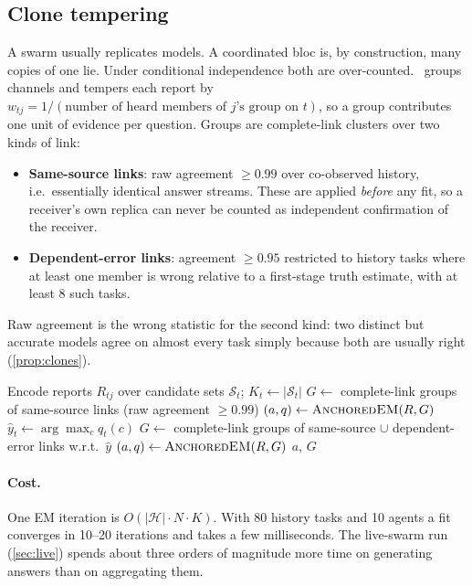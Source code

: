 \subsection{Clone tempering}
A swarm usually replicates models. A coordinated bloc is, by construction, many copies of one lie. Under conditional independence both are over-counted. \race\ groups channels and tempers each report by $w_{tj}=1/(\text{number of heard members of $j$'s group on $t$})$, so a group contributes one unit of evidence per question. Groups are complete-link clusters over two kinds of link:
\begin{itemize}
\item \textbf{Same-source links}: raw agreement $\ge 0.99$ over co-observed history, i.e.\ essentially identical answer streams. These are applied \emph{before} any fit, so a receiver's own replica can never be counted as independent confirmation of the receiver.
\item \textbf{Dependent-error links}: agreement $\ge 0.95$ restricted to history tasks where at least one member is wrong relative to a first-stage truth estimate, with at least 8 such tasks.
\end{itemize}
Raw agreement is the wrong statistic for the second kind: two distinct but accurate models agree on almost every task simply because both are usually right (\cref{prop:clones}).

\begin{algorithm}[t]
\caption{\race\ fit for one receiver $i$ (history $\mathcal H$, no labels)}\label{alg:race}
\begin{algorithmic}[1]
\State Encode reports $R_{tj}$ over candidate sets $\mathcal S_t$; $K_t\gets|\mathcal S_t|$
\State $G\gets$ complete-link groups of same-source links (raw agreement $\ge 0.99$)
\State $(a,q)\gets\textsc{AnchoredEM}(R, G)$ 
\State $\hat y_t\gets\arg\max_c q_t(c)$
\State $G\gets$ complete-link groups of same-source $\cup$ dependent-error links w.r.t.\ $\hat y$
\State $(a,q)\gets\textsc{AnchoredEM}(R, G)$
\State \Return $a$, $G$ 
\end{algorithmic}
\end{algorithm}

\paragraph{Cost.} One EM iteration is $O(|\mathcal H|\cdot N\cdot K)$. With 80 history tasks and 10 agents a fit converges in 10--20 iterations and takes a few milliseconds. The live-swarm run (\cref{sec:live}) spends about three orders of magnitude more time on generating answers than on aggregating them.

